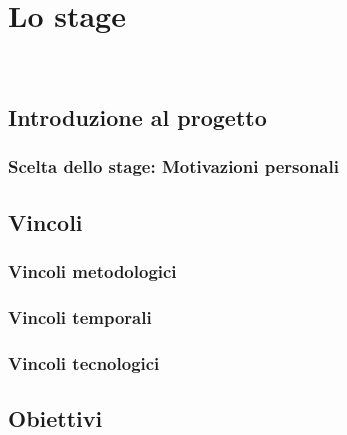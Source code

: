 
\pagestyle{IHA-fancy-style}
\chapter{Lo stage}
\label{cap:lo-stage}

\\

\section{Introduzione al progetto}

\subsection{Scelta dello stage: Motivazioni personali}

\section{Vincoli}
\subsection{Vincoli metodologici}
\subsection{Vincoli temporali}
\subsection{Vincoli tecnologici}

\section{Obiettivi}

